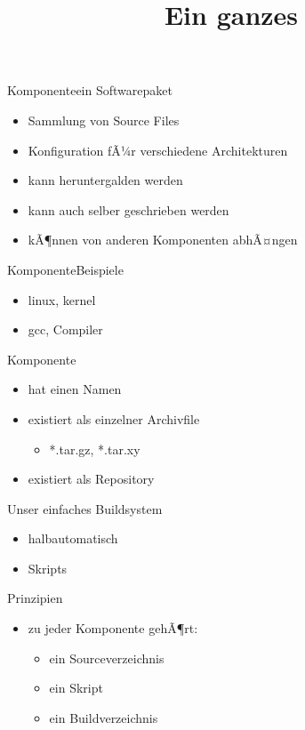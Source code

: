 \documentclass{beamer}
\begin{document}
\title[Build Again]{Ein ganzes \linux}

\begin{frame}{Komponente}{ein Softwarepaket}
 \begin{itemize}
  \item Sammlung von Source Files
  \item Konfiguration fÃ¼r verschiedene Architekturen
  \item kann heruntergalden werden
  \item kann auch selber geschrieben werden
  \item kÃ¶nnen von anderen Komponenten abhÃ¤ngen
 \end{itemize}
\end{frame}

\begin{frame}{Komponente}{Beispiele}
 \begin{itemize}
  \item linux, kernel
  \item gcc, Compiler 
 \end{itemize}
\end{frame}

\begin{frame}{Komponente}
 \begin{itemize}
  \item hat einen Namen
  \item existiert als einzelner Archivfile 
  \begin{itemize}
   \item *.tar.gz, *.tar.xy 
  \end{itemize}
  \item existiert als Repository
 \end{itemize}
\end{frame}

\begin{frame}{Unser einfaches Buildsystem}
 \begin{itemize}
  \item halbautomatisch
  \item Skripts
 \end{itemize}
\end{frame}

\begin{frame}{Prinzipien}
 \begin{itemize}
  \item zu jeder Komponente gehÃ¶rt:
  \begin{itemize}
   \item ein Sourceverzeichnis
   \item ein Skript
   \item ein Buildverzeichnis
  \end{itemize}
 \end{itemize}
\end{frame}
\end{document}
